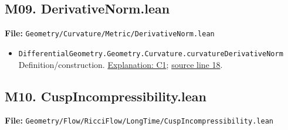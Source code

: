 \documentclass[
  letterpaper,
  11pt]{article}
\providecommand{\tightlist}{%
  \setlength{\itemsep}{0pt}\setlength{\parskip}{0pt}}
\begin{document}

\subsection{M09. DerivativeNorm.lean}\label{m09.-derivativenorm.lean}

\textbf{File:}
{\small\texttt{Geometry/\allowbreak{}Curvature/\allowbreak{}Metric/\allowbreak{}Derivative\allowbreak{}Norm.\allowbreak{}lean}}

\begin{itemize}
\tightlist
\item
  {\small\texttt{Differential\allowbreak{}Geometry.\allowbreak{}Geometry.\allowbreak{}Curvature.\allowbreak{}curvature\allowbreak{}Derivative\allowbreak{}Norm}}\\
  Definition/construction. \hyperref[collapse-tensor]{Explanation: C1};
  \href{https://github.com/qinz1yang/differential-geometry-dev/blob/ea0fae60ee01ef8c8d9b57a51794c6538f679c5d/DifferentialGeometry/Geometry/Curvature/Metric/DerivativeNorm.lean\#L18}{source
  line 18}.
\end{itemize}


\subsection{M10.
CuspIncompressibility.lean}\label{m10.-cuspincompressibility.lean}

\textbf{File:}
{\small\texttt{Geometry/\allowbreak{}Flow/\allowbreak{}Ricci\allowbreak{}Flow/\allowbreak{}Long\allowbreak{}Time/\allowbreak{}Cusp\allowbreak{}Incompressibility.\allowbreak{}lean}}
\end{document}
